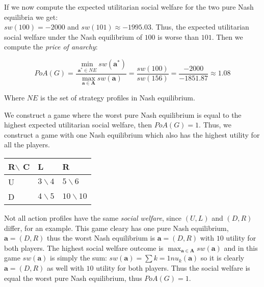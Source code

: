 \documentclass[12pt]{article}
\newenvironment{answer}[2][Answer]{\begin{trivlist}
\item[\hskip \labelsep {\bfseries #1}\hskip \labelsep {\bfseries #2:}]}{\end{trivlist}}
\begin{document}
\begin{answer}{a)}
If we now compute the expected utilitarian social welfare for the two pure Nash equilibria we get: \\
$sw(100)=-2000$ and $sw(101)\approx-1995.03$. Thus, the expected utilitarian social welfare under the Nash equilibrium of $100$ is worse than $101$. Then we compute the \textit{price of anarchy}:

$$PoA(G)=\frac{\min_{\boldsymbol{a}^* \in NE }sw(\boldsymbol{a}^*)}{\max_{\boldsymbol{a} \in \boldsymbol{A}}sw(\boldsymbol{a})}=\frac{sw(100)}{sw(156)}=\frac{-2000}{-1851.87}\approx1.08$$

Where $NE$ is the set of strategy profiles in Nash equilibrium.
\end{answer}
\begin{answer}{b)}
We construct a game where the worst pure Nash equilibrium is equal to the highest expected utilitarian social welfare, then $PoA(G)=1$. Thus, we construct a game with one Nash equilibrium which also has the highest utility for all the players.

\begin{table}[h]
    \begin{tabular}{|l|l|l|}
    \hline
    R$\backslash$ C & L            & R              \\ \hline
    U & $3\backslash 4$ & $5\backslash 6$   \\ \hline
    D & $4\backslash 5$ & $10\backslash 10$ \\ \hline
    \end{tabular}
\end{table}

Not all action profiles have the same \textit{social welfare}, since $(U,L)$ and $(D,R)$ differ, for an example.
This game cleary has one pure Nash equilibrium, $\boldsymbol{a}=(D,R)$ thus the worst Nash equilibrium is $\boldsymbol{a}=(D,R)$ with $10$ utility for both players. The highest social welfare outcome is $\max_{\boldsymbol{a} \in \boldsymbol{A}}sw(\boldsymbol{a})$ and in this game $sw(\boldsymbol{a})$ is simply the sum: $sw(\boldsymbol{a})=\sum{k=1}{n}{u_k(\boldsymbol{a})}$ so it is clearly $\boldsymbol{a}=(D,R)$ as well with $10$ utility for both players. Thus the social welfare is equal the worst pure Nash equilibrium, thus $PoA(G)=1$.

\end{answer}
\end{document}
